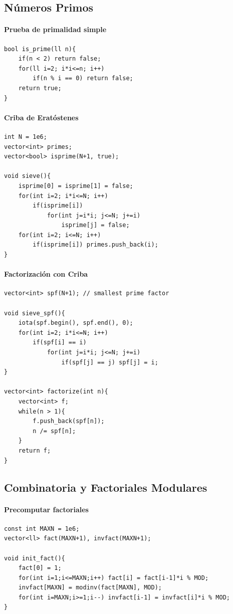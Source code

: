 \documentclass{article}
\begin{document}
\subsection{Números Primos}

\paragraph{Prueba de primalidad simple}
\begin{lstlisting}[style=cppstyle]
bool is_prime(ll n){
    if(n < 2) return false;
    for(ll i=2; i*i<=n; i++)
        if(n % i == 0) return false;
    return true;
}
\end{lstlisting}

\paragraph{Criba de Eratóstenes}
\begin{lstlisting}[style=cppstyle]
int N = 1e6;
vector<int> primes;
vector<bool> isprime(N+1, true);

void sieve(){
    isprime[0] = isprime[1] = false;
    for(int i=2; i*i<=N; i++)
        if(isprime[i])
            for(int j=i*i; j<=N; j+=i)
                isprime[j] = false;
    for(int i=2; i<=N; i++)
        if(isprime[i]) primes.push_back(i);
}
\end{lstlisting}

\paragraph{Factorización con Criba}
\begin{lstlisting}[style=cppstyle]
vector<int> spf(N+1); // smallest prime factor

void sieve_spf(){
    iota(spf.begin(), spf.end(), 0);
    for(int i=2; i*i<=N; i++)
        if(spf[i] == i)
            for(int j=i*i; j<=N; j+=i)
                if(spf[j] == j) spf[j] = i;
}

vector<int> factorize(int n){
    vector<int> f;
    while(n > 1){
        f.push_back(spf[n]);
        n /= spf[n];
    }
    return f;
}
\end{lstlisting}


\subsection{Combinatoria y Factoriales Modulares}

\paragraph{Precomputar factoriales}
\begin{lstlisting}[style=cppstyle]
const int MAXN = 1e6;
vector<ll> fact(MAXN+1), invfact(MAXN+1);

void init_fact(){
    fact[0] = 1;
    for(int i=1;i<=MAXN;i++) fact[i] = fact[i-1]*i % MOD;
    invfact[MAXN] = modinv(fact[MAXN], MOD);
    for(int i=MAXN;i>=1;i--) invfact[i-1] = invfact[i]*i % MOD;
}
\end{lstlisting}
\end{document}
